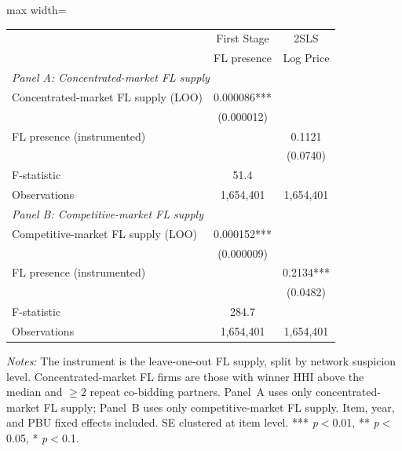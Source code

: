\caption{IV Estimates by FL Suspicion Level (Network Split)}
\label{tab:iv_network_split}
\begin{adjustbox}{max width=\textwidth}
\begin{threeparttable}
\small
\begin{tabular}{lcc}
\toprule
 & First Stage & 2SLS \\
 & FL presence & Log Price \\
\midrule
\multicolumn{3}{l}{\textit{Panel A: Concentrated-market FL supply}} \\[3pt]
Concentrated-market FL supply (LOO) & 0.000086*** & \\
 & (0.000012) & \\
FL presence (instrumented) & & 0.1121 \\
 & & (0.0740) \\
F-statistic & 51.4 & \\
Observations & 1,654,401 & 1,654,401 \\
\midrule
\multicolumn{3}{l}{\textit{Panel B: Competitive-market FL supply}} \\[3pt]
Competitive-market FL supply (LOO) & 0.000152*** & \\
 & (0.000009) & \\
FL presence (instrumented) & & 0.2134*** \\
 & & (0.0482) \\
F-statistic & 284.7 & \\
Observations & 1,654,401 & 1,654,401 \\
\bottomrule
\end{tabular}
\begin{tablenotes}
\small
\item \textit{Notes:} The instrument is the leave-one-out FL supply, split by
network suspicion level. Concentrated-market FL firms are those with winner HHI above
the median and $\geq$2 repeat co-bidding partners. Panel~A uses only
concentrated-market FL supply; Panel~B uses only competitive-market FL supply. Item, year,
and PBU fixed effects included. SE clustered at item level.
*** \textit{p}$<$0.01, ** \textit{p}$<$0.05, * \textit{p}$<$0.1.
\end{tablenotes}
\end{threeparttable}
\end{adjustbox}
